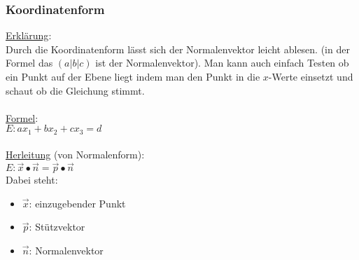 
\subsubsection{Koordinatenform}
\underline{Erklärung}: \\
Durch die Koordinatenform lässt sich der Normalenvektor leicht ablesen. 
(in der Formel das $(a|b|c)$ ist der Normalenvektor).
Man kann auch einfach Testen ob ein Punkt auf der Ebene liegt indem man den Punkt in die $x$-Werte einsetzt und schaut ob die Gleichung stimmt.
\\\\
\underline{Formel}: \\
$
E: ax_1 + bx_2 + cx_3 = d
$
\\\\
\underline{Herleitung} (von Normalenform): \\
$
E: \vec{x} \bullet \vec{n} = \vec{p} \bullet \vec{n}
$
\\
Dabei steht: 
\begin{itemize}
    \item $\vec{x}$: einzugebender Punkt
    \item $\vec{p}$: Stützvektor
    \item $\vec{n}$: Normalenvektor
\end{itemize}
